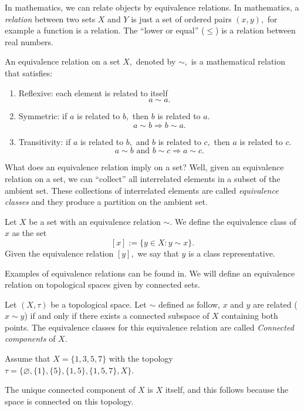 \documentclass[
	fontsize=10pt, %
	twoside=false, %
	secnumdepth=1, %
]{kaobook}
\begin{document}
In mathematics, we can relate objects by equivalence relations. In mathematics, a \emph{relation} between two sets $X$ and $Y$ is just a set of ordered pairs $(x,y),$ for example a function is a relation. The ``lower or equal'' ($\leq$) is a relation between real numbers.

\begin{definition}
An equivalence relation on a set $X,$ denoted by $\sim,$ is a mathematical relation that satisfies:
\begin{enumerate}
\item Reflexive: each element is related to itself $$a\sim a.$$

\item Symmetric: if $a$ is related to $b,$ then $b$ is related to $a.$ $$a\sim b\Rightarrow b\sim a.$$

\item Transitivity: if $a$ is related to $b,$ and $b$ is related to $c,$ then $a$ is related to $c.$ $$a\sim b \mbox{ and }b\sim c\Rightarrow a\sim c.$$
\end{enumerate}
\end{definition}

What does an equivalence relation imply on a set? Well, given an equivalence relation on a set, we can ``collect'' all interrelated elements in a subset of the ambient set. These collections of interrelated elements are called \emph{equivalence classes} and they produce a partition on the ambient set.

\begin{definition}
Let $X$ be a set with an equivalence relation $\sim.$ We define the equivalence class of $x$ as the set $$[x]:=\{y\in X: y\sim x\}.$$
Given the equivalence relation $[y],$ we say that $y$ is a class representative. 
\end{definition}
Examples of equivalence relations can be found in.
We will define an equivalence relation on topological spaces given by connected sets.
\begin{definition}
Let $(X,\tau)$ be a topological space. Let $\sim$ defined as follow, $x$ and $y$ are related ($x\sim y$) if and only if there exists a connected subspace of $X$ containing both points. 
The equivalence classes for this equivalence relation are called \emph{Connected components} of $X.$
\end{definition}
\begin{example}
Assume that $X=\{1,3,5,7\}$ with the topology $\tau=\{\varnothing,\{1\},\{5\},\{1,5\},\{1,5,7\},X\}.$ 

The unique connected component of $X$ is $X$ itself, and this follows because the space is connected on this topology.
\end{example}
\end{document}
